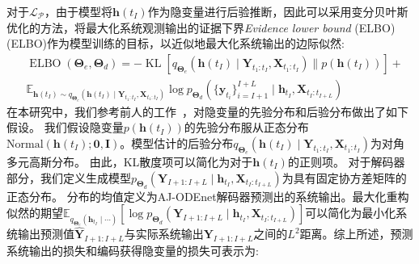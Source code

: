 对于$\mathcal{L_P}$，由于模型将$\boldsymbol h(t_I)$作为隐变量进行后验推断，因此可以采用变分贝叶斯优化的方法，将最大化系统观测输出的证据下界\textit{Evidence lower bound} (ELBO) (ELBO)作为模型训练的目标，以近似地最大化系统输出的边际似然\cite{10.5555/3454287.3454765}:
\begin{equation}
\begin{aligned}
&\operatorname{ELBO}(\boldsymbol{\Theta}_e,\boldsymbol{\Theta}_d)=-\operatorname{KL}\left[q_{\boldsymbol \Theta_e}(\boldsymbol h({t_I}) \mid\boldsymbol{Y}_{t_{1}: t_{I}}, \boldsymbol{X}_{t_{1}: t_{I}}) \| p\left(\boldsymbol h({t_I})\right)\right]+\\&\mathbb{E}_{\boldsymbol h({t_I}) \sim q_{\boldsymbol \Theta_e}(\boldsymbol h({t_I}) \mid\boldsymbol{Y}_{t_{1}: t_{I}}, \boldsymbol{X}_{t_{1}: t_{I}})}\log p_{\boldsymbol \Theta_d}(\{\boldsymbol y_{t_i}\}_{i=I+1}^{I+L}\mid \boldsymbol h_{t_I},\boldsymbol X_{t_I:t_{I+L}})
\end{aligned}
\end{equation}
在本研究中，我们参考前人的工作~\cite{chen2018neural, 10.5555/3454287.3454765, Yildiz2019}，对隐变量的先验分布和后验分布做出了如下假设。
我们假设隐变量$p(\boldsymbol{h}(t_I))$的先验分布服从正态分布$\text{Normal}(\boldsymbol{h}(t_I);\boldsymbol 0, \boldsymbol I)$。模型估计的后验分布$q_{\boldsymbol \Theta_e}(\boldsymbol h({t_I}) \mid\boldsymbol{Y}_{t_{1}: t_{I}}, \boldsymbol{X}_{t_{1}: t_{I}})$为对角多元高斯分布。
由此，KL散度项可以简化为对于$\boldsymbol h(t_I)$的正则项。
对于解码器部分，我们定义生成模型$p_{\boldsymbol \Theta_d}({\boldsymbol Y}_{I+1: I+L}\mid \boldsymbol h_{t_I},\boldsymbol X_{t_I:t_{I+L}})$为具有固定协方差矩阵的正态分布。
分布的均值定义为AJ-ODEnet解码器预测出的系统输出。最大化重构似然的期望$\mathbb{E}_{q_{\boldsymbol \Theta_e}(\boldsymbol h_{t_I} \mid\cdots)}\left[\log p_{\boldsymbol \Theta_d}({\boldsymbol Y}_{I+1: I+L}\mid \boldsymbol h_{t_I},\boldsymbol X_{t_I:t_{I+L}})\right]$可以简化为最小化系统输出预测值$\hat{\boldsymbol Y}_{I+1: I+L}$与实际系统输出${\boldsymbol Y}_{I+1: I+L}$之间的$L^2$距离。综上所述，预测系统输出的损失和编码获得隐变量的损失可表示为:

